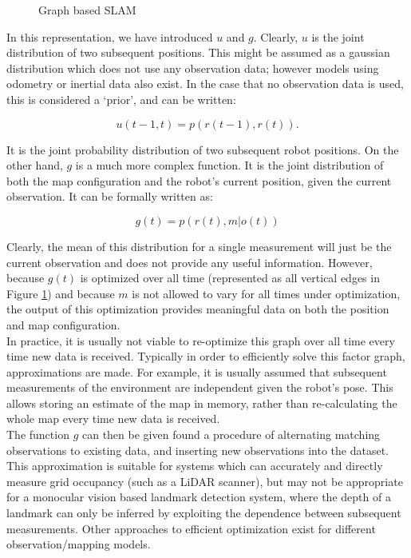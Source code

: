 \documentclass[capstone_report.tex]{subfiles}
\begin{document}
\begin{figure}[H]
\centering
  
  \caption{Graph based SLAM\label{fig:graphSlam1}}
\end{figure}

In this representation, we have introduced $u$ and $g$. Clearly, $u$ is the joint distribution of two subsequent positions. This might be assumed as a gaussian distribution which does not use any observation data; however models using odometry or inertial data also exist. In the case that no observation data is used, this is considered a `prior', and can be written:

    \[u(t-1,t) = p(r(t-1), r(t)). \]

It is the joint probability distribution of two subsequent robot positions. On the other hand, $g$ is a much more complex function. It is the joint distribution of both the map configuration and the robot's current position, given the current observation. It can be formally written as: 

\[
  g(t) = p(r(t),m | o(t))
\]

Clearly, the mean of this distribution for a single measurement will just be the current observation and does not provide any useful information. However, because $g(t)$ is optimized over all time (represented as all vertical edges in Figure \ref{fig:graphSlam1}) and because $m$ is not allowed to vary for all times under optimization, the output of this optimization provides meaningful data on both the position and map configuration.\\

In practice, it is usually not viable to re-optimize this graph over all time every time new data is received. Typically in order to efficiently solve this factor graph, approximations are made. For example, it is usually assumed that subsequent measurements of the environment are independent given the robot's pose. This allows storing an estimate of the map in memory, rather than re-calculating the whole map every time new data is received.\\

The function $g$ can then be given found a procedure of alternating matching observations to existing data, and inserting new observations into the dataset. This approximation is suitable for systems which can accurately and directly measure grid occupancy (such as a LiDAR scanner), but may not be appropriate for a monocular vision based landmark detection system, where the depth of a landmark can only be inferred by exploiting the dependence between subsequent measurements. Other approaches to efficient optimization exist for different observation/mapping models.\\
\end{document}
